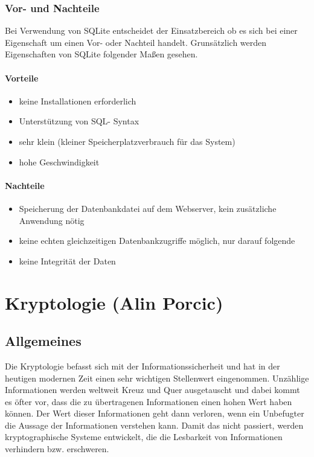 \documentclass[12pt,a4paper]{report}
\begin{document}
\begin{onehalfspace}
\subsection{Vor- und Nachteile}
Bei Verwendung von SQLite entscheidet der Einsatzbereich ob es sich bei einer Eigenschaft um einen Vor- oder Nachteil handelt. Grunsätzlich werden Eigenschaften von SQLite folgender Maßen gesehen.
\subsubsection{Vorteile}
\begin{itemize}
\item keine Installationen erforderlich
\item Unterstützung von SQL- Syntax
\item sehr klein (kleiner Speicherplatzverbrauch für das System)
\item hohe Geschwindigkeit
\end{itemize}
\subsubsection{Nachteile}
\begin{itemize}
\item Speicherung der Datenbankdatei auf dem Webserver, kein zusätzliche Anwendung nötig
\item keine echten gleichzeitigen Datenbankzugriffe möglich, nur darauf folgende
\item keine Integrität der Daten
\end{itemize}

\chapter{Kryptologie (Alin Porcic)}\label{chap:krypto}
\section{Allgemeines}

Die Kryptologie befasst sich mit der Informationssicherheit und hat in der heutigen modernen Zeit einen sehr wichtigen Stellenwert eingenommen. Unzählige Informationen werden weltweit Kreuz und Quer ausgetauscht und dabei kommt es öfter vor, dass die zu übertragenen Informationen einen hohen Wert haben können. Der Wert dieser Informationen geht dann verloren, wenn ein Unbefugter die Aussage der Informationen verstehen kann. Damit das nicht passiert, werden kryptographische Systeme entwickelt, die die Lesbarkeit von Informationen verhindern bzw. erschweren.\\


\end{onehalfspace}
\end{document}
